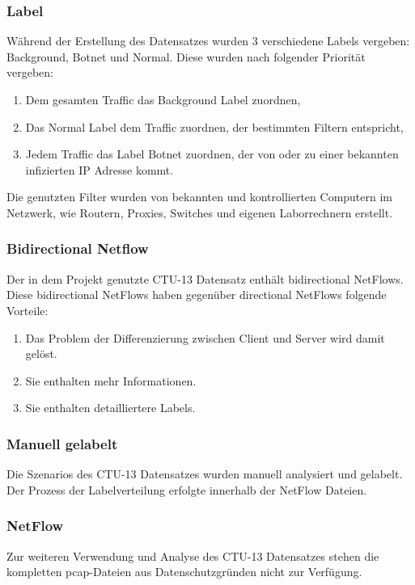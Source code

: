 \documentclass[main.tex]{subfiles}
\begin{document}
\subsubsection{Label}
Während der Erstellung des Datensatzes wurden 3 verschiedene Labels vergeben: Background, Botnet und Normal. Diese wurden nach folgender Priorität vergeben: 
\begin{center}
\begin{enumerate}
\item Dem gesamten Traffic das Background Label zuordnen,
\item Das Normal Label dem Traffic zuordnen, der bestimmten Filtern entspricht,
\item Jedem Traffic das Label Botnet zuordnen, der von oder zu einer bekannten infizierten IP Adresse kommt.
\end{enumerate}
\end{center}
Die genutzten Filter wurden von bekannten und kontrollierten Computern im Netzwerk, wie Routern, Proxies, Switches und eigenen Laborrechnern erstellt.
\subsubsection{Bidirectional Netflow}
 Der in dem Projekt genutzte CTU-13 Datensatz enthält bidirectional NetFlows. Diese bidirectional NetFlows haben gegenüber directional NetFlows folgende Vorteile: 
\begin{center}
\begin{enumerate}
\item Das Problem der Differenzierung zwischen Client und Server wird damit gelöst.
\item Sie enthalten mehr Informationen.
\item Sie enthalten detailliertere Labels.
\end{enumerate}
\end{center}
\subsubsection{Manuell gelabelt}
Die Szenarios des CTU-13 Datensatzes wurden manuell analysiert und gelabelt. Der Prozess der Labelverteilung erfolgte innerhalb der NetFlow Dateien.
\subsubsection{NetFlow}
Zur weiteren Verwendung und Analyse des CTU-13 Datensatzes stehen die kompletten pcap-Dateien aus Datenschutzgründen nicht zur Verfügung.
\end{document}
